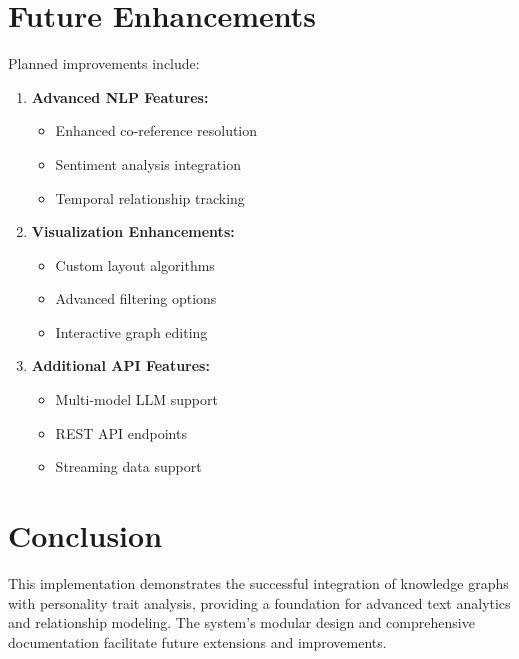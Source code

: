 \documentclass[11pt]{article}
\begin{document}
\section{Future Enhancements}
Planned improvements include:

\begin{enumerate}
    \item \textbf{Advanced NLP Features:}
    \begin{itemize}
        \item Enhanced co-reference resolution
        \item Sentiment analysis integration
        \item Temporal relationship tracking
    \end{itemize}
    
    \item \textbf{Visualization Enhancements:}
    \begin{itemize}
        \item Custom layout algorithms
        \item Advanced filtering options
        \item Interactive graph editing
    \end{itemize}
    
    \item \textbf{Additional API Features:}
    \begin{itemize}
        \item Multi-model LLM support
        \item REST API endpoints
        \item Streaming data support
    \end{itemize}
\end{enumerate}

\section{Conclusion}
This implementation demonstrates the successful integration of knowledge graphs with personality trait analysis, providing a foundation for advanced text analytics and relationship modeling. The system's modular design and comprehensive documentation facilitate future extensions and improvements.
\end{document}
